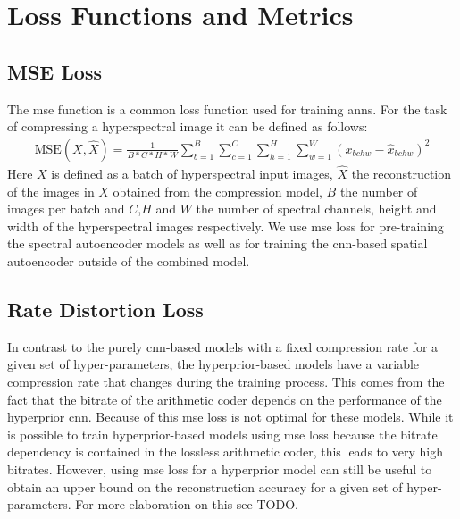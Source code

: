 \section{Loss Functions and Metrics}

\subsection{MSE Loss}
The \ac{mse} function is a common loss function used for training \acp{ann}. For the task of compressing a hyperspectral image it can be defined as follows:
\begin{align}
\text{MSE}(X,\hat{X}) = \frac{1}{B*C*H*W} \sum_{b=1}^{B}\sum_{c=1}^{C}\sum_{h=1}^H\sum_{w=1}^W (x_{bchw} - \hat{x}_{bchw})^2
\end{align}
Here $X$ is defined as a batch of hyperspectral input images, $\hat{X}$ the reconstruction of the images in $X$ obtained from the compression model, $B$ the number of images per batch and $C$,$H$ and $W$ the number of spectral channels, height and width of the hyperspectral images respectively.
We use \ac{mse} loss for pre-training the spectral autoencoder models as well as for training the \ac{cnn}-based spatial autoencoder outside of the combined model.

\subsection{Rate Distortion Loss}
In contrast to the purely \ac{cnn}-based models with a fixed compression rate for a given set of hyper-parameters, the hyperprior-based models have a variable compression rate that changes during the training process. This comes from the fact that the bitrate of the arithmetic coder depends on the performance of the hyperprior \ac{cnn}. Because of this \ac{mse} loss is not optimal for these models. While it is possible to train hyperprior-based models using \ac{mse} loss because the bitrate dependency is contained in the lossless arithmetic coder, this leads to very high bitrates. However, using \ac{mse} loss for a hyperprior model can still be useful to obtain an upper bound on the reconstruction accuracy for a given set of hyper-parameters. For more elaboration on this see TODO.

